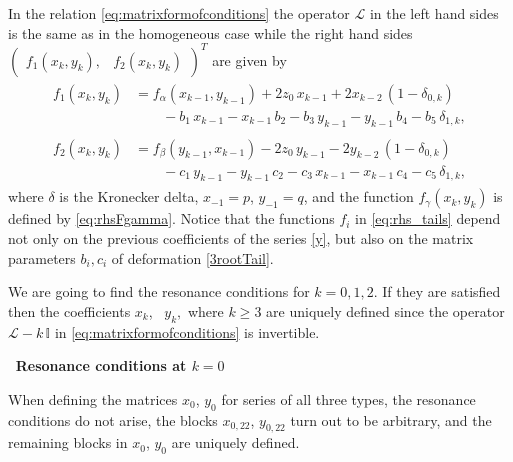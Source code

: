 \documentclass{article}
\theoremstyle{plain}
\newcommand{\brackets}[1]{\left( #1 \right)}
\begin{document}
In the relation \eqref{eq:matrixformofconditions} the operator $\mathcal L$ in the left hand sides is the same as in the homogeneous case while the right hand sides  $\begin{pmatrix} f_1 \brackets{x_k, y_k}, & f_2 \brackets{x_k, y_k} \end{pmatrix}^T$ are given by 
\begin{equation}
    \label{eq:rhs_tails}
    \begin{gathered}
    \begin{aligned}
    f_1 \brackets{x_k, y_k}
    &= f_{\alpha} \brackets{x_{k - 1}, y_{k - 1}}
    + 2 z_0 \, x_{k - 1}
    + 2 x_{k - 2} \, \brackets{1 - \delta_{0,k}}
    \\
    & \qquad
    - b_1 \, x_{k - 1}
    - x_{k - 1} \, b_2
    - b_3 \, y_{k - 1}
    - y_{k - 1} \, b_4
    - b_5 \, \delta_{1,k},
    \end{aligned}
    \\[2mm]
    \begin{aligned}
    f_2 \brackets{x_k, y_k}
    &= f_{\beta} \brackets{y_{k - 1}, x_{k - 1}}
    - 2 z_0 \, y_{k - 1}
    - 2 y_{k - 2} \, \brackets{1 - \delta_{0,k}}
    \\
    & \qquad
    - c_1 \, y_{k - 1}
    - y_{k - 1} \, c_2
    - c_3 \, x_{k - 1}
    - x_{k - 1} \, c_4
    - c_5 \, \delta_{1,k},
    \end{aligned}
    \end{gathered}
\end{equation}
where $\delta$ is the Kronecker delta, $x_{-1} = p$, $y_{-1} = q$, and the function $f_{\gamma} \brackets{x_k, y_k}$ is defined by \eqref{eq:rhsFgamma}. Notice that the functions $f_i$ in \eqref{eq:rhs_tails} depend not only on the previous coefficients of the series \eqref{y}, but also on the matrix parameters $b_i, c_i$ of deformation \eqref{3rootTail}. 

We are going to find the resonance conditions for $k=0,1,2$. If they are satisfied then the coefficients $x_k$, \, $y_k,$ where $k \ge 3$ are uniquely defined since the operator ${\mathcal L}- k \, \mathbb{I}$ in \eqref{eq:matrixformofconditions} is invertible. 

\medskip
\textbf{\textbullet \, Resonance conditions at $k = 0$}

When defining the matrices $x_0$, $y_0$ for series of all three types, the resonance conditions do not arise, the blocks $x_{0, 22}$, $y_{0, 22}$ turn out to be arbitrary, and the remaining blocks in  $x_0$, $y_0$ are uniquely defined.
 
\end{document}
